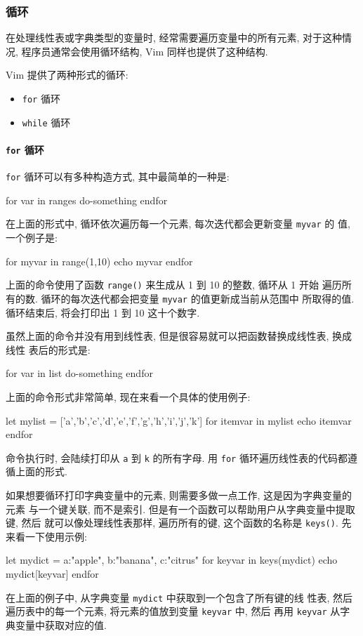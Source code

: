 \subsubsection{循环}
\label{subsubsec:loops}

在处理线性表或字典类型的变量时, 经常需要遍历变量中的所有元素, 对于这种情况,
程序员通常会使用循环结构, Vim 同样也提供了这种结构.

Vim 提供了两种形式的循环:
\begin{itemize}
	\item \texttt{for} 循环
	\item \texttt{while} 循环
\end{itemize}

\paragraph{\texttt{for} 循环}
\label{para:for_loops}

\texttt{for} 循环可以有多种构造方式, 其中最简单的一种是:
\begin{vimcode}
for var in ranges
	do-something
endfor
\end{vimcode}
在上面的形式中, 循环依次遍历每一个元素, 每次迭代都会更新变量 \texttt{myvar} 的
值, 一个例子是:
\begin{vimcode}
for myvar in range(1,10)
	echo myvar
endfor
\end{vimcode}
上面的命令使用了函数 \texttt{range()} 来生成从 1 到 10 的整数, 循环从 1 开始
遍历所有的数. 循环的每次迭代都会把变量 \texttt{myvar} 的值更新成当前从范围中
所取得的值. 循环结束后, 将会打印出 1 到 10 这十个数字.

虽然上面的命令并没有用到线性表, 但是很容易就可以把函数替换成线性表, 换成线性
表后的形式是:
\begin{vimcode}
for var in list
	do-something
endfor
\end{vimcode}
上面的命令形式非常简单, 现在来看一个具体的使用例子:
\begin{vimcode}
let mylist = ['a','b','c','d','e','f','g','h','i','j','k']
for itemvar in mylist
    echo itemvar
endfor
\end{vimcode}
命令执行时, 会陆续打印从 \texttt{a} 到 \texttt{k} 的所有字母. 用 \texttt{for}
循环遍历线性表的代码都遵循上面的形式.

如果想要循环打印字典变量中的元素, 则需要多做一点工作, 这是因为字典变量的元素
与一个键关联, 而不是索引. 但是有一个函数可以帮助用户从字典变量中提取键, 然后
就可以像处理线性表那样, 遍历所有的键, 这个函数的名称是 \texttt{keys()}. 先
来看一下使用示例:
\begin{vimcode}
let mydict = {a:"apple", b:"banana", c:"citrus" }
for keyvar in keys(mydict)
    echo mydict[keyvar]
endfor
\end{vimcode}
在上面的例子中, 从字典变量 \texttt{mydict} 中获取到一个包含了所有键的线
性表, 然后遍历表中的每一个元素, 将元素的值放到变量 \texttt{keyvar} 中, 然后
再用 \texttt{keyvar} 从字典变量中获取对应的值.

